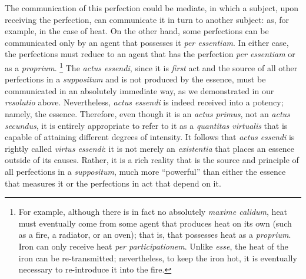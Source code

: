 The communication of this perfection could be mediate, in which a subject, upon receiving the perfection, can communicate it in turn to another subject: as, for example, in the case of heat. On the other hand, some perfections can be communicated only by an agent that possesses it \emph{per essentiam}. In either case, the perfections must reduce to an agent that has the perfection \emph{per essentiam} or as a \emph{proprium}.%
%
\footnote{For example, although there is in fact no absolutely \emph{maxime calidum}, heat must eventually come from some agent that produces heat on its own (such as a fire, a radiator, or an oven); that is, that possesses heat as a \emph{proprium}. Iron can only receive heat \emph{per participationem}. Unlike \emph{esse}, the heat of the iron can be re-transmitted; nevertheless, to keep the iron hot, it is eventually necessary to re-introduce it into the fire.}
%
The \emph{actus essendi}, since it is \emph{first} act and the source of all other perfections in a \emph{suppositum} and is not produced by the essence, must be communicated in an absolutely immediate way, as we demonstrated in our \emph{resolutio} above. Nevertheless, \emph{actus essendi} is indeed received into a potency; namely, the essence. Therefore, even though it is an \emph{actus primus}, not an \emph{actus secundus}, it is entirely appropriate to refer to it as a \emph{quantitas virtualis} that is capable of attaining different degrees of intensity. It follows that \emph{actus essendi} is rightly called \emph{virtus essendi}: it is not merely an \emph{existentia} that places an essence outside of its causes. Rather, it is a rich reality that is the source and principle of all perfections in a \emph{suppositum}, much more ``powerful'' than either the essence that measures it or the perfections in act that depend on it.

